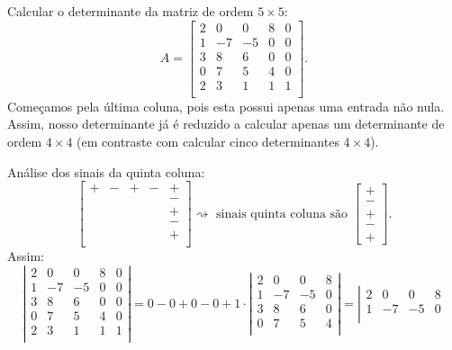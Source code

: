 \documentclass[../livro.tex]{subfiles}  %
\begin{document}
\begin{example}\label{exp:det2}
Calcular o determinante da matriz de ordem $5 \times 5$:
\[
A = 
\begin{bmatrix}
2 & 0 & 0 & 8 & 0 \\
1 & -7 & -5 & 0 & 0 \\
3 & 8 & 6 & 0 & 0 \\
0 & 7 & 5 & 4 & 0 \\
2 & 3 & 1 & 1 & 1 \\
\end{bmatrix}.
\] Começamos pela última coluna, pois esta possui apenas uma entrada não nula. Assim, nosso determinante já é reduzido a calcular apenas um determinante de ordem $4 \times 4$ (em contraste com calcular cinco determinantes $4\times 4$).

Análise dos sinais da quinta coluna:
\[
\begin{bmatrix}
+ & - & + & - & + \\
 &&&& - \\
 &&&& + \\
 &&&& - \\
 &&&& + \\
\end{bmatrix}\rightsquigarrow \text{ sinais quinta coluna são }
\begin{bmatrix}
+ \\ - \\ + \\ - \\ +
\end{bmatrix}.
\] Assim:
\[
\left| 
\begin{matrix}
2 & 0 & 0 & 8 & 0 \\
1 & -7 & -5 & 0 & 0 \\
3 & 8 & 6 & 0 & 0 \\
0 & 7 & 5 & 4 & 0 \\
2 & 3 & 1 & 1 & 1 \\
\end{matrix}
\right| = 0 - 0 + 0 - 0 + 1\cdot 
\left| 
\begin{matrix}
2 & 0 & 0 & 8  \\
1 & -7 & -5 & 0  \\
3 & 8 & 6 & 0  \\
0 & 7 & 5 & 4  \\
\end{matrix}
\right| = 
\left| 
\begin{matrix}
2 & 0 & 0 & 8  \\
1 & -7 & -5 & 0  \\

\end{matrix}\]
\end{example}
\end{document}

